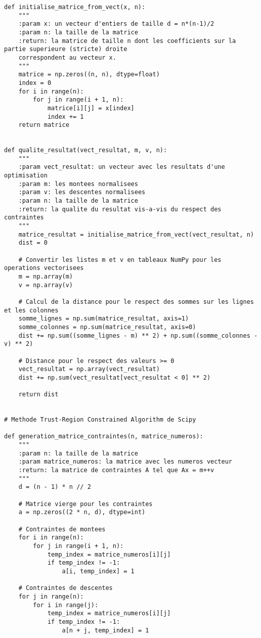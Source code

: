 \documentclass[12pt]{article}
\begin{document}
\begin{lstlisting}
def initialise_matrice_from_vect(x, n):
    """
    :param x: un vecteur d'entiers de taille d = n*(n-1)/2
    :param n: la taille de la matrice
    :return: la matrice de taille n dont les coefficients sur la partie superieure (stricte) droite
    correspondent au vecteur x.
    """
    matrice = np.zeros((n, n), dtype=float)
    index = 0
    for i in range(n):
        for j in range(i + 1, n):
            matrice[i][j] = x[index]
            index += 1
    return matrice


def qualite_resultat(vect_resultat, m, v, n):
    """
    :param vect_resultat: un vecteur avec les resultats d'une optimisation
    :param m: les montees normalisees
    :param v: les descentes normalisees
    :param n: la taille de la matrice
    :return: la qualite du resultat vis-a-vis du respect des contraintes
    """
    matrice_resultat = initialise_matrice_from_vect(vect_resultat, n)
    dist = 0

    # Convertir les listes m et v en tableaux NumPy pour les operations vectorisees
    m = np.array(m)
    v = np.array(v)

    # Calcul de la distance pour le respect des sommes sur les lignes et les colonnes
    somme_lignes = np.sum(matrice_resultat, axis=1)
    somme_colonnes = np.sum(matrice_resultat, axis=0)
    dist += np.sum((somme_lignes - m) ** 2) + np.sum((somme_colonnes - v) ** 2)

    # Distance pour le respect des valeurs >= 0
    vect_resultat = np.array(vect_resultat)
    dist += np.sum(vect_resultat[vect_resultat < 0] ** 2)

    return dist


# Methode Trust-Region Constrained Algorithm de Scipy

def generation_matrice_contraintes(n, matrice_numeros):
    """
    :param n: la taille de la matrice
    :param matrice_numeros: la matrice avec les numeros vecteur
    :return: la matrice de contraintes A tel que Ax = m++v
    """
    d = (n - 1) * n // 2

    # Matrice vierge pour les contraintes
    a = np.zeros((2 * n, d), dtype=int)

    # Contraintes de montees
    for i in range(n):
        for j in range(i + 1, n):
            temp_index = matrice_numeros[i][j]
            if temp_index != -1:
                a[i, temp_index] = 1

    # Contraintes de descentes
    for j in range(n):
        for i in range(j):
            temp_index = matrice_numeros[i][j]
            if temp_index != -1:
                a[n + j, temp_index] = 1


\end{lstlisting}
\end{document}
